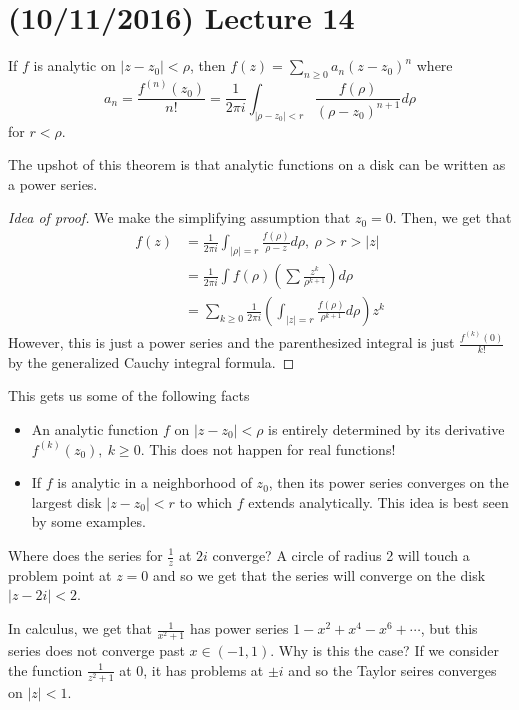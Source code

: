 \documentclass[11pt,leqno,oneside]{amsart}
\begin{document}
  \section{(10/11/2016) Lecture 14}
  \begin{thm}
    If $f$ is analytic on $|z-z_0|<\rho$, then $f(z) = \sum_{n \geq 0}
    a_n(z-z_0)^n$ where \[a_n = \frac{f^{(n)}(z_0)}{n!} =
      \frac{1}{2\pi i}\int_{|\rho - z_0| < r}
      \frac{f(\rho)}{(\rho-z_0)^{n+1}}d\rho \]
    for $r < \rho$. 
  \end{thm}
  The upshot of this theorem is that analytic functions on a disk can
  be written as a power series.
  \begin{proof}[Idea of proof]
    We make the simplifying assumption that $z_0 = 0$. Then, we get
    that
    \begin{align*}
      f(z) & = \frac{1}{2 \pi i} \int_{|\rho| = r}
             \frac{f(\rho)}{\rho-z}d\rho, \ \rho > r > |z| \\
      \ & = \frac{1}{2\pi i} \int f(\rho)
          \left(
          \sum \frac{z^k}{\rho^{k+1}}
          \right) d \rho \\
      \ & = \sum_{k \geq 0} \frac{1}{2 \pi i}
          \left(
          \int_{|z|=r} \frac{f(\rho)}{\rho^{k+1}}d\rho
          \right)z^k
    \end{align*}
    However, this is just a power series and the parenthesized
    integral is just $\frac{f^{(k)}(0)}{k!}$ by the generalized Cauchy
    integral formula.
  \end{proof}
  This gets us some of the following facts
  \begin{itemize}
  \item An analytic function $f$ on $|z-z_0| < \rho$ is entirely
    determined by its derivative $f^{(k)}(z_0), \ k \geq 0$. This does
    not happen for real functions!
  \item If $f$ is analytic in a neighborhood of $z_0$, then its power
    series converges on the largest disk $|z-z_0| < r$ to which $f$
    extends analytically. This idea is best seen by some examples.
  \end{itemize}
  \begin{example}
    Where does the series for $\frac{1}{z}$ at $2i$ converge? A circle
    of radius 2 will touch a problem point at $z=0$ and so we get that
    the series will converge on the disk $|z-2i| < 2$. 
  \end{example}
  \begin{example}
    In calculus, we get that $\frac{1}{x^2+1}$ has power series
    $1-x^2+x^4-x^6+\cdots$, but this series does not converge past $x
    \in (-1,1)$. Why is this the case? If we consider the function
    $\frac{1}{z^2+1}$ at 0, it has problems at $\pm i$ and so the
    Taylor seires converges on $|z|<1$. 
  \end{example}
\end{document}
